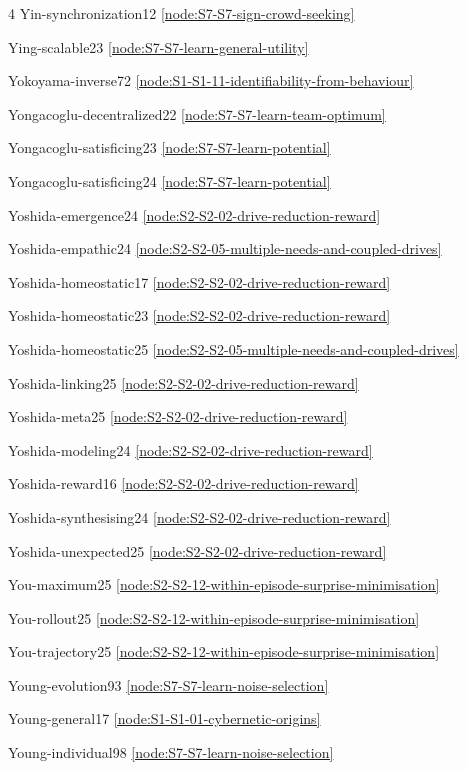 \documentclass[10pt]{article}
\begin{document}
{\begin{multicols}{4}
Yin-synchronization12 \hfill \ref{node:S7-S7-sign-crowd-seeking}\par
Ying-scalable23 \hfill \ref{node:S7-S7-learn-general-utility}\par
Yokoyama-inverse72 \hfill \ref{node:S1-S1-11-identifiability-from-behaviour}\par
Yongacoglu-decentralized22 \hfill \ref{node:S7-S7-learn-team-optimum}\par
Yongacoglu-satisficing23 \hfill \ref{node:S7-S7-learn-potential}\par
Yongacoglu-satisficing24 \hfill \ref{node:S7-S7-learn-potential}\par
Yoshida-emergence24 \hfill \ref{node:S2-S2-02-drive-reduction-reward}\par
Yoshida-empathic24 \hfill \ref{node:S2-S2-05-multiple-needs-and-coupled-drives}\par
Yoshida-homeostatic17 \hfill \ref{node:S2-S2-02-drive-reduction-reward}\par
Yoshida-homeostatic23 \hfill \ref{node:S2-S2-02-drive-reduction-reward}\par
Yoshida-homeostatic25 \hfill \ref{node:S2-S2-05-multiple-needs-and-coupled-drives}\par
Yoshida-linking25 \hfill \ref{node:S2-S2-02-drive-reduction-reward}\par
Yoshida-meta25 \hfill \ref{node:S2-S2-02-drive-reduction-reward}\par
Yoshida-modeling24 \hfill \ref{node:S2-S2-02-drive-reduction-reward}\par
Yoshida-reward16 \hfill \ref{node:S2-S2-02-drive-reduction-reward}\par
Yoshida-synthesising24 \hfill \ref{node:S2-S2-02-drive-reduction-reward}\par
Yoshida-unexpected25 \hfill \ref{node:S2-S2-02-drive-reduction-reward}\par
You-maximum25 \hfill \ref{node:S2-S2-12-within-episode-surprise-minimisation}\par
You-rollout25 \hfill \ref{node:S2-S2-12-within-episode-surprise-minimisation}\par
You-trajectory25 \hfill \ref{node:S2-S2-12-within-episode-surprise-minimisation}\par
Young-evolution93 \hfill \ref{node:S7-S7-learn-noise-selection}\par
Young-general17 \hfill \ref{node:S1-S1-01-cybernetic-origins}\par
Young-individual98 \hfill \ref{node:S7-S7-learn-noise-selection}\par

\end{multicols}}
\end{document}
